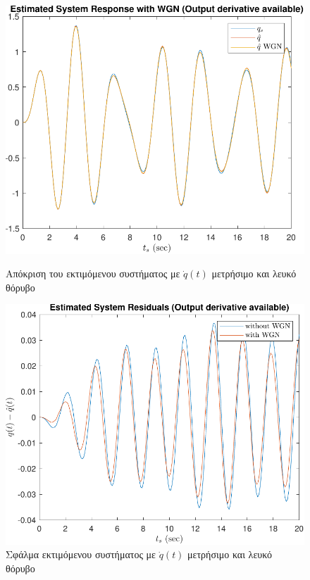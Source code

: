 \documentclass[a4paper,12pt]{article}
\begin{document}
\begin{figure}[!h]
    \centering
    \begin{minipage}{0.45\textwidth}
        \centering
        \includegraphics[width=\linewidth]{plot/task3_response_with_derivative_WGN.pdf}
        \caption{Απόκριση του εκτιμόμενου συστήματος με $\dot{q}(t)$ μετρήσιμο και λευκό θόρυβο}
        \label{fig:task3_response_with_derivative_WGN}
    \end{minipage}
    \hfill
    \begin{minipage}{0.45\textwidth}
        \centering
        \includegraphics[width=\linewidth]{plot/task3_residuals_with_derivative_WGN.pdf}
        \caption{Σφάλμα εκτιμόμενου συστήματος με $\dot{q}(t)$ μετρήσιμο και λευκό θόρυβο}
        \label{fig:task3_residuals_with_derivative_WGN}
    \end{minipage}
\end{figure}
\end{document}
